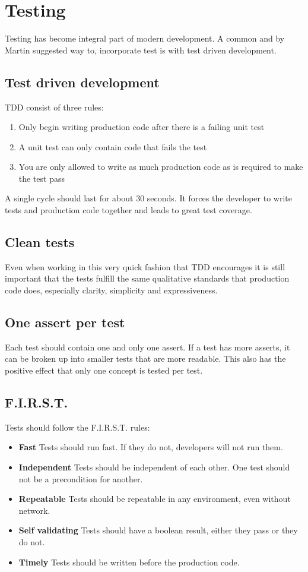 \section{Testing}
Testing has become integral part of modern development. A common and by Martin suggested way to, incorporate test is with test driven development.

\subsection{Test driven development}
TDD consist of three rules:

\begin{enumerate}
    \item Only begin writing production code after there is a failing unit test
    \item A unit test can only contain code that fails the test
    \item You are only allowed to write as much production code as is required to make the test pass
\end{enumerate}

A single cycle should last for about 30 seconds. It forces the developer to write tests and production code together and leads to great test coverage.

\subsection{Clean tests}
Even when working in this very quick fashion that TDD encourages it is still important that the tests fulfill the same qualitative standards that production code does, especially clarity, simplicity and expressiveness.

\subsection{One assert per test}
Each test should contain one and only one assert. If a test has more asserts, it can be broken up into smaller tests that are more readable. This also has the positive effect that only one concept is tested per test.

\subsection{F.I.R.S.T.}
Tests should follow the F.I.R.S.T. rules:

\begin{itemize}
    \item[] \textbf{Fast} Tests should run fast. If they do not, developers will not run them.
    \item[] \textbf{Independent} Tests should be independent of each other. One test should not be a precondition for another.
    \item[] \textbf{Repeatable} Tests should be repeatable in any environment, even without network.
    \item[] \textbf{Self validating} Tests should have a boolean result, either they pass or they do not.
    \item[] \textbf{Timely} Tests should be written before the production code.
\end{itemize}
